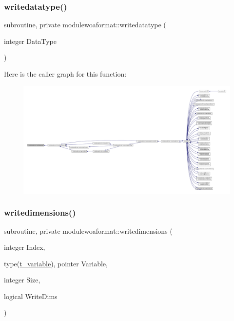 \mbox{\label{namespacemodulewoaformat_a87baefa0ce052791b45523ab1bd52868}} 
\subsubsection{\texorpdfstring{writedatatype()}{writedatatype()}}
{\footnotesize\ttfamily subroutine, private modulewoaformat\+::writedatatype (\begin{DoxyParamCaption}\item[{integer}]{Data\+Type }\end{DoxyParamCaption})\hspace{0.3cm}{\ttfamily [private]}}

Here is the caller graph for this function\+:\nopagebreak
\begin{figure}[H]
\begin{center}
\leavevmode
\includegraphics[width=350pt]{namespacemodulewoaformat_a87baefa0ce052791b45523ab1bd52868_icgraph}
\end{center}
\end{figure}
\mbox{\label{namespacemodulewoaformat_a2416c77f949cd03e164c70c78493ad37}} 
\subsubsection{\texorpdfstring{writedimensions()}{writedimensions()}}
{\footnotesize\ttfamily subroutine, private modulewoaformat\+::writedimensions (\begin{DoxyParamCaption}\item[{integer}]{Index,  }\item[{type(\mbox{\hyperlink{structmodulewoaformat_1_1t__variable}{t\+\_\+variable}}), pointer}]{Variable,  }\item[{integer}]{Size,  }\item[{logical}]{Write\+Dims }\end{DoxyParamCaption})\hspace{0.3cm}{\ttfamily [private]}}

